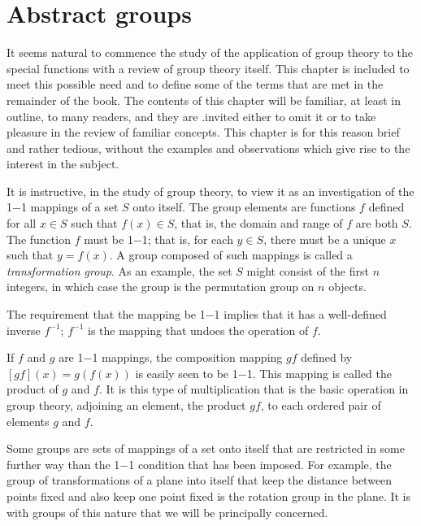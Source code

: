 \chapter{Abstract groups}

It seems natural to commence the study of the application of group theory to the special functions with a review of group theory itself. This chapter is included to meet this possible need and to define some of the terms that are met in the remainder of the book. The contents of this chapter will be familiar, at least in outline, to many readers, and they are .invited either to omit it or to take pleasure in the review of familiar concepts. This chapter is for this reason brief and rather tedious, without the examples and observations which give rise to the interest in the subject. 

It is instructive, in the study of group theory, to view it as an investigation of the 1$-$1 mappings of a set $S$ onto itself. The group elements are functions $f$ defined for all $x \in S$ such that $f(x) \in S$, that is, the domain and range of $f$ are both $S$. The function $f$ must be 1$-$1; that is, for each $y \in S$, there must be a unique $x$ such that $y = f(x)$. A group composed of such mappings is called a \emph{transformation group}. As an example, the set $S$ might consist of the first $n$ integers, in which case the group is the permutation group on $n$ objects.

The requirement that the mapping be 1$-$1 implies that it has a well-defined inverse $f^{-1}$; $f^{-1}$ is the mapping that undoes the operation of $f$.

If $f$ and $g$ are 1$-$1 mappings, the composition mapping $gf$ defined by $[gf] (x) = g(f(x))$ is easily seen to be 1$-$1. This mapping is called the product of $g$ and $f$. It is this type of multiplication that is the basic operation in group theory, adjoining an element, the product $gf$, to each ordered pair of elements $g$ and $f$.

Some groups are sets of mappings of a set onto itself that are restricted in some further way than the 1$-$1 condition that has been imposed. For example, the group of transformations of a plane into itself that keep the distance between points fixed and also keep one point fixed is the rotation group in the plane. It is with groups of this nature that we will be principally concerned.







\endinput